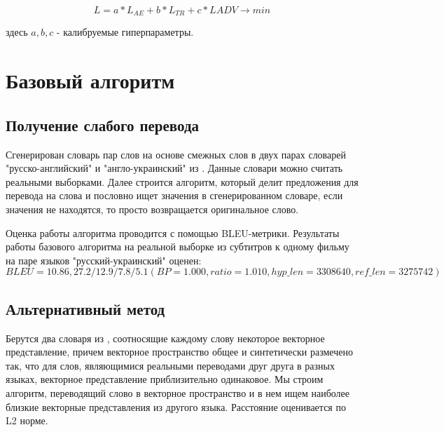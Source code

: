 \documentclass[12pt,twoside]{article}
\begin{document}
$$L = a*L_{AE} + b*L_{TR}+c*L{ADV} \longrightarrow min$$

здесь $a,b,c$ - калибруемые гиперпараметры.

\section{Базовый алгоритм}
\subsection{Получение слабого перевода}
Сгенерирован словарь пар слов на основе смежных слов в двух парах словарей "русско-английский" и "англо-украинский" из \cite{conneau2017word}. Данные словари можно считать реальными выборками. Далее строится алгоритм, который делит предложения для перевода на слова и пословно ищет значения в сгенерированном словаре, если значения не находятся, то просто возвращается оригинальное слово.

Оценка работы алгоритма проводится с помощью BLEU-метрики. Результаты работы базового алгоритма на реальной выборке из субтитров к одному фильму на паре языков "русский-украинский" оценен: $$BLEU = 10.86, 27.2/12.9/7.8/5.1 (BP=1.000, ratio=1.010, hyp\_len=3308640, ref\_len=3275742)$$


\subsection{Альтернативный метод}
Берутся два словаря из \cite{conneau2017word}, соотносящие каждому слову некоторое векторное представление, причем векторное пространство общее и синтетически размечено так, что для слов, являющимися реальными переводами друг друга в разных языках, векторное представление приблизительно одинаковое. Мы строим алгоритм, переводящий слово в векторное пространство и в нем ищем наиболее близкие векторные представления из другого языка. Расстояние оценивается по L2 норме.

\newpage


\end{document}
